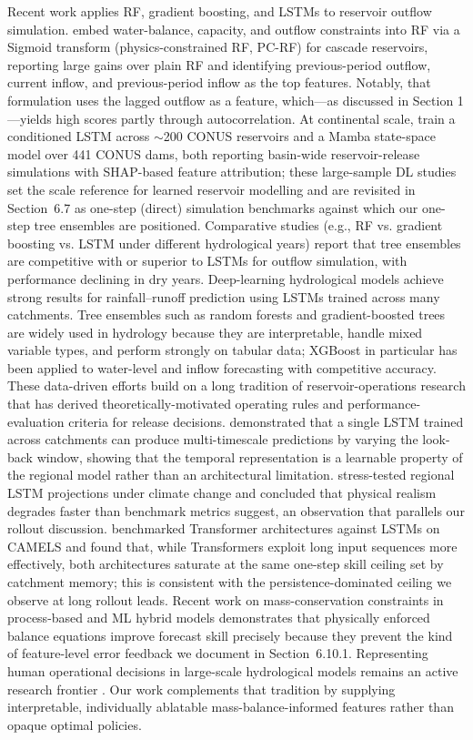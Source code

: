 \documentclass[journal]{ascelike-new}
\begin{document}
Recent work applies RF, gradient boosting, and LSTMs to reservoir outflow simulation. \citet{Zhou2025} embed water-balance, capacity, and outflow constraints into RF via a Sigmoid transform (physics-constrained RF, PC-RF) for cascade reservoirs, reporting large gains over plain RF and identifying previous-period outflow, current inflow, and previous-period inflow as the top features. Notably, that formulation uses the lagged outflow as a feature, which---as discussed in Section 1---yields high scores partly through autocorrelation. At continental scale, \citet{Tran2025} train a conditioned LSTM across $\sim$200 CONUS reservoirs and \citet{Zhang2025} a Mamba state-space model over 441 CONUS dams, both reporting basin-wide reservoir-release simulations with SHAP-based feature attribution; these large-sample DL studies set the scale reference for learned reservoir modelling and are revisited in Section~6.7 as one-step (direct) simulation benchmarks against which our one-step tree ensembles are positioned. Comparative studies (e.g., RF vs. gradient boosting vs. LSTM under different hydrological years) report that tree ensembles are competitive with or superior to LSTMs for outflow simulation, with performance declining in dry years. Deep-learning hydrological models \citep{Kratzert2018,Kratzert2019} achieve strong results for rainfall--runoff prediction using LSTMs trained across many catchments. Tree ensembles such as random forests and gradient-boosted trees are widely used in hydrology because they are interpretable, handle mixed variable types, and perform strongly on tabular data; XGBoost in particular has been applied to water-level and inflow forecasting with competitive accuracy. These data-driven efforts build on a long tradition of reservoir-operations research that has derived theoretically-motivated operating rules \citep{Lund1999} and performance-evaluation criteria \citep{Hashimoto1982} for release decisions. \citet{Gauch2021} demonstrated that a single LSTM trained across catchments can produce multi-timescale predictions by varying the look-back window, showing that the temporal representation is a learnable property of the regional model rather than an architectural limitation. \citet{Wi2022} stress-tested regional LSTM projections under climate change and concluded that physical realism degrades faster than benchmark metrics suggest, an observation that parallels our rollout discussion. \citet{Liu2024} benchmarked Transformer architectures against LSTMs on CAMELS and found that, while Transformers exploit long input sequences more effectively, both architectures saturate at the same one-step skill ceiling set by catchment memory; this is consistent with the persistence-dominated ceiling we observe at long rollout leads. Recent work on mass-conservation constraints in process-based and ML hybrid models \citep{Frame2023} demonstrates that physically enforced balance equations improve forecast skill precisely because they prevent the kind of feature-level error feedback we document in Section~6.10.1. Representing human operational decisions in large-scale hydrological models remains an active research frontier \citep{Galelli2025}. Our work complements that tradition by supplying interpretable, individually ablatable mass-balance-informed features rather than opaque optimal policies.
\end{document}
